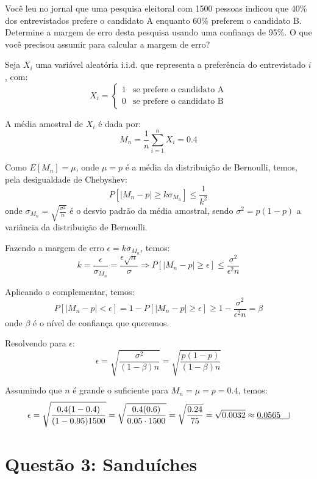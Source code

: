 \documentclass[12 pt]{article}
\begin{document}
Você leu no jornal que uma pesquisa eleitoral com 1500 pessoas indicou que 40\% dos entrevistados prefere o candidato A enquanto 60\% preferem o candidato B. Determine a margem de erro desta pesquisa usando uma confiança de 95\%. O que você precisou assumir para calcular a margem de erro?
\begin{tcolorbox}[colframe=black, title=Resposta:]
    Seja $X_i$ uma variável aleatória i.i.d. que representa a preferência do entrevistado $i$, com:
    $$
    X_i = \begin{cases}
    1 & \text{se prefere o candidato A} \\
    0 & \text{se prefere o candidato B}
    \end{cases}
    $$
    
    A média amostral de $X_i$ é dada por:
    $$
    M_n = \frac{1}{n}\sum_{i=1}^n X_i =  0.4
    $$

    Como $E[M_n] = \mu$, onde $\mu=p$ é a média da distribuição de Bernoulli, temos, pela desigualdade de Chebyshev:
    $$
    P[|M_n - p| \geq k \sigma_{M_n}] \leq \frac{1}{k^2}
    $$
    onde $\sigma_{M_n} = \sqrt{\frac{\sigma^2}{n}}$ é o desvio padrão da média amostral, sendo $\sigma^2 = p(1-p)$ a variância da distribuição de Bernoulli.

    Fazendo a margem de erro $\epsilon = k \sigma_{M_n}$, temos:
    $$
    k=\frac{\epsilon}{\sigma_{M_n}} = \frac{\epsilon\sqrt{n}}{\sigma} \Rightarrow P[|M_n - p| \geq \epsilon] \leq \frac{\sigma^2}{\epsilon^2n}
    $$

    Aplicando o complementar, temos:
    $$
    P[|M_n - p| < \epsilon] = 1 - P[|M_n - p| \geq \epsilon] \geq 1 - \frac{\sigma^2}{\epsilon^2n}=\beta
    $$
    onde $\beta$ é o nível de confiança que queremos.

    Resolvendo para $\epsilon$:
    $$
    \epsilon = \sqrt{\frac{\sigma^2}{(1-\beta)n}} = \sqrt{\frac{p(1-p)}{(1-\beta)n}}
    $$

    Assumindo que $n$ é grande o suficiente para $M_n=\mu=p=0.4$, temos:
    $$
    \epsilon = \sqrt{\frac{0.4(1-0.4)}{(1-0.95)1500}} = \sqrt{\frac{0.4(0.6)}{0.05\cdot1500}} = \sqrt{\frac{0.24}{75}} = \sqrt{0.0032} \approx \underline{0.0565 \quad \vline}
    $$
\end{tcolorbox}

\section*{Questão 3: Sanduíches}
\end{document}
